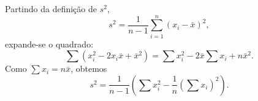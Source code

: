 Partindo da definição de $s^{2}$,
\[
s^{2}=\frac{1}{n-1}\sum_{i=1}^{n}(x_i-\bar{x})^{2},
\]
expande-se o quadrado:
\[
\sum(x_i^2 -2x_i\bar{x}+\bar{x}^2)=\sum x_i^2 -2\bar{x}\sum x_i + n\bar{x}^2.
\]
Como $\sum x_i = n\bar{x}$, obtemos
\[
s^{2}=\frac{1}{n-1}\left(\sum x_i^2 - \frac{1}{n}(\sum x_i)^2\right).
\]